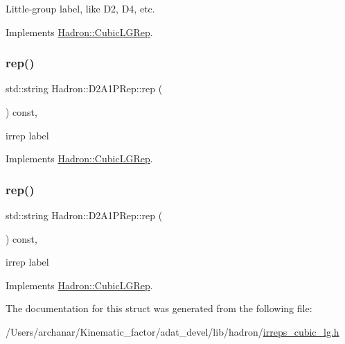 Little-\/group label, like D2, D4, etc. 

Implements \mbox{\hyperlink{structHadron_1_1CubicLGRep_a9bdb14b519a611d21379ed96a3a9eb41}{Hadron\+::\+Cubic\+L\+G\+Rep}}.

\mbox{\label{structHadron_1_1D2A1PRep_a127d5b4fc80ab71a7b8f3356713d4976}} 
\subsubsection{\texorpdfstring{rep()}{rep()}\hspace{0.1cm}{\footnotesize\ttfamily [1/2]}}
{\footnotesize\ttfamily std\+::string Hadron\+::\+D2\+A1\+P\+Rep\+::rep (\begin{DoxyParamCaption}{ }\end{DoxyParamCaption}) const\hspace{0.3cm}{\ttfamily [inline]}, {\ttfamily [virtual]}}

irrep label 

Implements \mbox{\hyperlink{structHadron_1_1CubicLGRep_a50f5ddbb8f4be4cee0106fa9e8c75e6c}{Hadron\+::\+Cubic\+L\+G\+Rep}}.

\mbox{\label{structHadron_1_1D2A1PRep_a127d5b4fc80ab71a7b8f3356713d4976}} 
\subsubsection{\texorpdfstring{rep()}{rep()}\hspace{0.1cm}{\footnotesize\ttfamily [2/2]}}
{\footnotesize\ttfamily std\+::string Hadron\+::\+D2\+A1\+P\+Rep\+::rep (\begin{DoxyParamCaption}{ }\end{DoxyParamCaption}) const\hspace{0.3cm}{\ttfamily [inline]}, {\ttfamily [virtual]}}

irrep label 

Implements \mbox{\hyperlink{structHadron_1_1CubicLGRep_a50f5ddbb8f4be4cee0106fa9e8c75e6c}{Hadron\+::\+Cubic\+L\+G\+Rep}}.



The documentation for this struct was generated from the following file\+:\begin{DoxyCompactItemize}
\item 
/\+Users/archanar/\+Kinematic\+\_\+factor/adat\+\_\+devel/lib/hadron/\mbox{\hyperlink{lib_2hadron_2irreps__cubic__lg_8h}{irreps\+\_\+cubic\+\_\+lg.\+h}}\end{DoxyCompactItemize}
